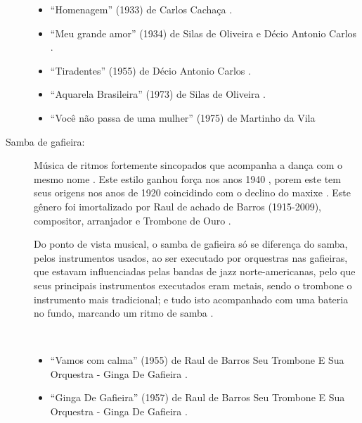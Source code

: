 \begin{description}
\begin{example}
\begin{itemize}
\item ``Homenagem'' (1933) de Carlos Cachaça \cite{rizzi2016musica}.
\item ``Meu grande amor'' (1934) de Silas de Oliveira e Décio Antonio Carlos \cite[pp. 84-85]{de2003tem}.
\item ``Tiradentes'' (1955) de Décio Antonio Carlos  \cite[pp. 86]{de2003tem}.
\item ``Aquarela Brasileira'' (1973) de Silas de Oliveira \cite[pp. 123]{de2003tem} \cite[pp. 253]{diniz2006almanaque}.
\item ``Você não passa de uma mulher'' (1975) de Martinho da Vila \cite{martinhodavila} \cite[pp. 185]{diniz2006almanaque}
\end{itemize}
\end{example}


\item[Samba de gafieira:] 
Música de ritmos fortemente sincopados que acompanha a dança com o mesmo nome \cite[pp. 291]{dourado2004dicionario}.
Este estilo ganhou força nos anos 1940 \cite[pp. 142]{perna2002samba} \cite[pp. 291]{dourado2004dicionario},
porem este tem seus origens nos anos de 1920 coincidindo com o declino do maxixe \cite[pp. 63]{reinato2010musica}.
Este gênero foi imortalizado por Raul de achado de Barros (1915-2009), 
compositor, arranjador e Trombone de Ouro \cite[pp. 63]{reinato2010musica}.

Do ponto de vista musical, o samba de gafieira só se diferença do samba, 
pelos instrumentos usados, ao ser executado por orquestras nas gafieiras,
que estavam influenciadas pelas bandas de jazz norte-americanas,
pelo que seus principais instrumentos executados eram metais, 
sendo o trombone o instrumento mais tradicional;
e tudo isto acompanhado com uma bateria no fundo, 
marcando um ritmo de samba \cite[pp. 131]{perna2002samba}.


\begin{example} ~

\begin{itemize}
\item ``Vamos com calma'' (1955) de  Raul de Barros Seu Trombone E Sua Orquestra - Ginga De Gafieira \cite{RaulDeBarrosMusic1}.
\item ``Ginga De Gafieira'' (1957) de  Raul de Barros Seu Trombone E Sua Orquestra - Ginga De Gafieira \cite{RaulDeBarrosMusic2}.
\end{itemize}
\end{example}


\end{description}
